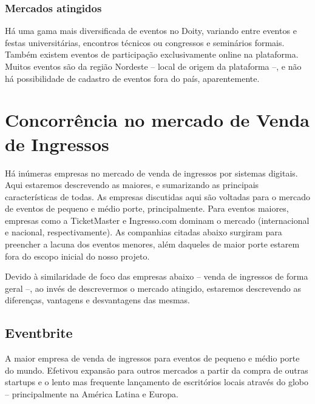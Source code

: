 \documentclass[12pt,a4paper,twoside,hyphens,english,brazil]{abntex2}
\begin{document}
\subsubsection*{Mercados atingidos}
Há uma gama mais diversificada de eventos no Doity, variando entre eventos e festas universitárias, encontros técnicos ou congressos e seminários formais. Também existem eventos de participação exclusivamente online na plataforma. Muitos eventos são da região Nordeste -- local de origem da plataforma --, e não há possibilidade de cadastro de eventos fora do país, aparentemente.

\section{Concorrência no mercado de Venda de Ingressos} \label{sec:sistemas:venda}
Há inúmeras empresas no mercado de venda de ingressos por sistemas digitais. Aqui estaremos descrevendo as maiores, e sumarizando as principais características de todas. As empresas discutidas aqui são voltadas para o mercado de eventos de pequeno e médio porte, principalmente. Para eventos maiores, empresas como a TicketMaster e Ingresso.com dominam o mercado (internacional e nacional, respectivamente). As companhias citadas abaixo surgiram para preencher a lacuna dos eventos menores, além daqueles de maior porte estarem fora do escopo inicial do nosso projeto.

Devido à similaridade de foco das empresas abaixo -- venda de ingressos de forma geral --, ao invés de descrevermos o mercado atingido, estaremos descrevendo as diferenças, vantagens e desvantagens das mesmas.

\subsection{Eventbrite}
A maior empresa de venda de ingressos para eventos de pequeno e médio porte do mundo. Efetivou expansão para outros mercados a partir da compra de outras startups e o lento mas frequente lançamento de escritórios locais através do globo -- principalmente na América Latina e Europa.
\end{document}

